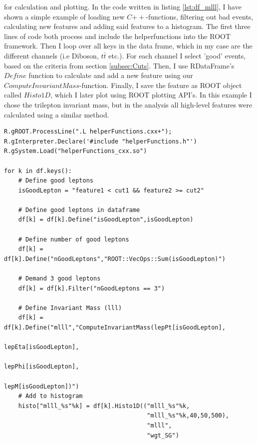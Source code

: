 for calculation and plotting. In the code written in listing \ref{lst:df_mlll}, I have shown a simple example 
of loading new $C{++}$-functions, filtering out bad events, calculating new features and adding said 
features to a histogram. The first three lines of code both process and include the helperfunctions 
into the ROOT framework. Then I loop over all keys in the data frame, which in my case
are the different channels (i.e Diboson, $t\bar{t}$ etc.). For each channel I select 'good' events,
based on the criteria from section \ref{subsec:Cuts}. Then, I use RDataFrame's $Define$ function to calculate
and add a new feature using our $ComputeInvariantMass$-function. Finally, I save the feature as ROOT object called 
$Histo1D$, which I later plot using ROOT plotting \ac{API}'s. In this example I chose the trilepton invariant mass, 
but in the analysis all high-level features were calculated using a similar method. 
\lstset{style=Python}
\begin{lstlisting}[caption={Python-file for calling dataframe and calculating $M_{lll}$.},captionpos=b, label={lst:df_mlll}]
R.gROOT.ProcessLine(".L helperFunctions.cxx+");
R.gInterpreter.Declare('#include "helperFunctions.h"') 
R.gSystem.Load("helperFunctions_cxx.so")

for k in df.keys():
    # Define good leptons
    isGoodLepton = "feature1 < cut1 && feature2 >= cut2"

    # Define good leptons in dataframe
    df[k] = df[k].Define("isGoodLepton",isGoodLepton)

    # Define number of good leptons
    df[k] = df[k].Define("nGoodLeptons","ROOT::VecOps::Sum(isGoodLepton)")

    # Demand 3 good leptons 
    df[k] = df[k].Filter("nGoodLeptons == 3")

    # Define Invariant Mass (lll)
    df[k] = df[k].Define("mlll","ComputeInvariantMass(lepPt[isGoodLepton], 
                                                      lepEta[isGoodLepton], 
                                                      lepPhi[isGoodLepton], 
                                                      lepM[isGoodLepton])")
    # Add to histogram
    histo["mlll_%s"%k] = df[k].Histo1D(("mlll_%s"%k,
                                        "mlll_%s"%k,40,50,500),
                                        "mlll",
                                        "wgt_SG")     
\end{lstlisting}



